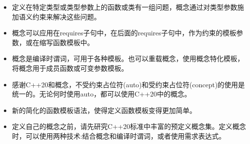 \begin{tcolorbox}[breakable,enhanced jigsaw,colback=mygreen!5!white,colframe=mygreen!75!black,title=总结]
\begin{itemize}
\item 
定义在特定类型或类型参数上的函数或类有一组问题，概念通过对类型参数施加语义约束来解决这些问题。

\item 
概念可以应用在requires子句中，在后面的requires子句中，作为约束的模板参数，或在缩写函数模板中。

\item 
概念是编译时谓词，可用于各种模板。也可以重载概念，使用概念特化模板，将概念用于成员函数或可变参数模板。

\item 
感谢C++20和概念，不受约束占位符(auto)和受约束占位符(concept)的使用是统一的。无论何时使用auto，都可以使用C++20中的概念。

\item 
新的简化的函数模板语法，使得定义函数模板变得更加简单。

\item 
定义自己的概念之前，请先研究C++20标准中丰富的预定义概念集。定义概念时，可以使用两种技术:结合概念和编译时谓词，或者使用需求表达式。
\end{itemize}
\end{tcolorbox}

\newpage

















